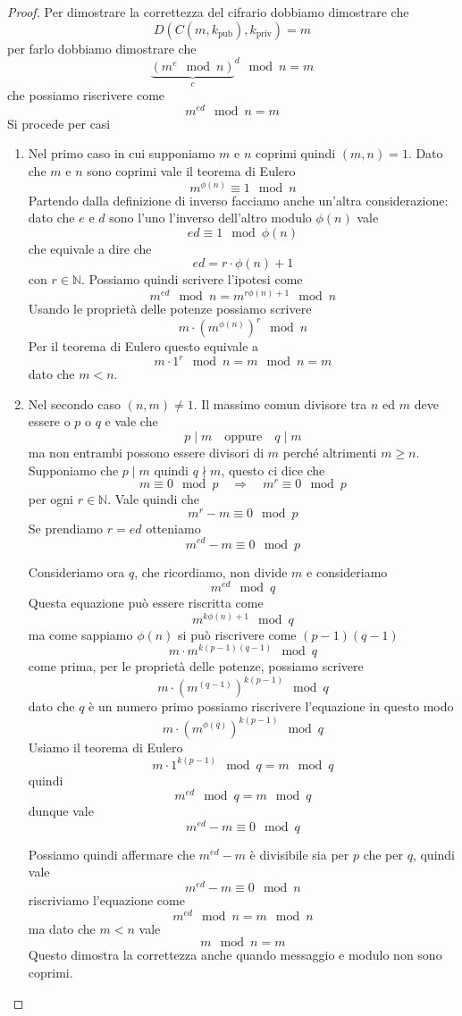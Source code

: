 \begin{proof}
	Per dimostrare la correttezza del cifrario dobbiamo dimostrare che
	\[ D(C(m, k_\text{pub}), k_\text{priv}) = m \]
	per farlo dobbiamo dimostrare che
	\[ {\underbrace{(m^e \mod{n})}_c}^d \mod{n} = m \]
	che possiamo riscrivere come
	\[ m^{ed} \mod{n} = m \]
	Si procede per casi
	\begin{enumerate}
		\item Nel primo caso in cui supponiamo $m$ e $n$ coprimi quindi $(m, n) = 1$. Dato che $m$ e $n$ sono coprimi
		      vale il teorema di Eulero
		      \[ m^{\phi(n)} \equiv 1 \mod{n} \]
		      Partendo dalla definizione di inverso facciamo anche un'altra considerazione: dato che $e$ e $d$ sono
		      l'uno l'inverso dell'altro modulo $\phi(n)$ vale
		      \[ ed \equiv 1 \mod{\phi(n)} \]
		      che equivale a dire che
		      \[ ed = r \cdot \phi(n) + 1 \]
		      con $r \in \mathbb{N}$. Possiamo quindi scrivere l'ipotesi come
		      \[ m^{ed} \mod{n} = m^{r \phi(n) + 1} \mod{n} \]
		      Usando le propriet\`a delle potenze possiamo scrivere
		      \[ m \cdot (m^{\phi(n)})^r \mod{n} \]
		      Per il teorema di Eulero questo equivale a
		      \[ m \cdot 1^r \mod{n} = m \mod{n} = m\]
		      dato che $m < n$.
		\item Nel secondo caso $(n, m) \neq 1$. Il massimo comun divisore tra $n$ ed $m$ deve essere o $p$ o $q$ e
		      vale che
		      \[ p \mid m \quad \text{oppure} \quad q \mid m \]
		      ma non entrambi possono essere divisori di $m$ perch\'e altrimenti $m \geq n$. Supponiamo che $p \mid m$
		      quindi $q \nmid m$, questo ci dice che
		      \[ m \equiv 0 \mod{p} \quad \Rightarrow \quad m^r \equiv 0 \mod{p} \]
		      per ogni $r \in \mathbb{N}$. Vale quindi che
		      \[ m^r - m \equiv 0 \mod{p} \]
		      Se prendiamo $r = ed$ otteniamo
		      \[ m^{ed} - m \equiv 0 \mod{p} \]

		      Consideriamo ora $q$, che ricordiamo, non divide $m$ e consideriamo
		      \[ m^{ed} \mod{q} \]
		      Questa equazione pu\`o essere riscritta come
		      \[ m^{k \phi(n) + 1} \mod{q} \]
		      ma come sappiamo $\phi(n)$ si pu\`o riscrivere come $(p - 1)(q - 1)$
		      \[ m \cdot m^{k (p - 1)(q - 1)} \mod{q} \]
		      come prima, per le propriet\`a delle potenze, possiamo scrivere
		      \[ m \cdot (m^{(q - 1)})^{k (p - 1)} \mod{q} \]
		      dato che $q$ \`e un numero primo possiamo riscrivere l'equazione in questo modo
		      \[ m \cdot (m^{\phi(q)})^{k (p - 1)} \mod{q} \]
		      Usiamo il teorema di Eulero
		      \[ m \cdot 1^{k (p - 1)} \mod{q} = m \mod{q} \]
		      quindi
		      \[ m^{ed} \mod{q} = m \mod{q} \]
		      dunque vale
		      \[ m^{ed} - m \equiv 0 \mod{q} \]

		      Possiamo quindi affermare che $m^{ed} - m$ \`e divisibile sia per $p$ che per $q$, quindi vale
		      \[ m^{ed} - m \equiv 0 \mod{n} \]
		      riscriviamo l'equazione come
		      \[ m^{ed} \mod{n} = m \mod{n} \]
		      ma dato che $m < n$ vale
		      \[ m \mod{n} = m \]
		      Questo dimostra la correttezza anche quando messaggio e modulo non sono coprimi.
	\end{enumerate}
\end{proof}

